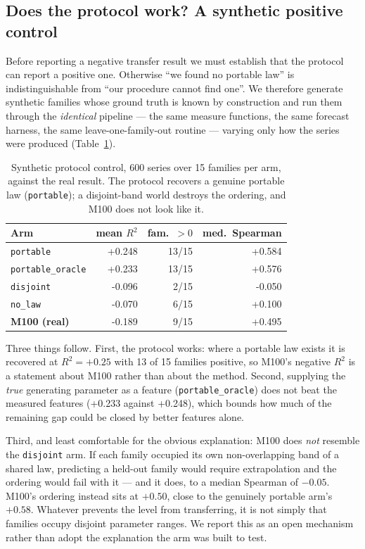 \documentclass[11pt,a4paper]{article}
\newcommand{\num}[1]{#1}
\begin{document}
\subsection{Does the protocol work? A synthetic positive control}
\label{sec:protocol}

Before reporting a negative transfer result we must establish that the protocol
can report a positive one. Otherwise ``we found no portable law'' is
indistinguishable from ``our procedure cannot find one''. We therefore generate
synthetic families whose ground truth is known by construction and run them
through the \emph{identical} pipeline --- the same measure functions, the same
forecast harness, the same leave-one-family-out routine --- varying only how the
series were produced (Table~\ref{tab:protocol}).

\begin{table}[t]
\centering
\caption{Synthetic protocol control, \num{600} series over \num{15} families
per arm, against the real result. The protocol recovers a genuine portable law
(\texttt{portable}); a disjoint-band world destroys the ordering, and M100 does
not look like it.}
\label{tab:protocol}
\small
\begin{tabular}{lrrr}
\toprule
Arm & mean \(R^2\) & fam.\ \(>0\) & med.\ Spearman \\
\midrule
\texttt{portable}     & \num{+0.248} & 13/15 & \num{+0.584} \\
\texttt{portable\_oracle} & \num{+0.233} & 13/15 & \num{+0.576} \\
\texttt{disjoint}     & \num{-0.096} & 2/15  & \num{-0.050} \\
\texttt{no\_law}       & \num{-0.070} & 6/15  & \num{+0.100} \\
\midrule
\textbf{M100 (real)}  & \num{-0.189} & 9/15  & \num{+0.495} \\
\bottomrule
\end{tabular}
\end{table}

Three things follow. First, the protocol works: where a portable law exists it
is recovered at \(R^2 = +0.25\) with \num{13} of \num{15} families positive,
so M100's negative \(R^2\) is a statement about M100 rather than about the
method. Second, supplying the \emph{true} generating parameter as a feature
(\texttt{portable\_oracle}) does not beat the measured features
(\num{+0.233} against \num{+0.248}), which bounds how much of the remaining gap
could be closed by better features alone.

Third, and least comfortable for the obvious explanation: M100 does \emph{not}
resemble the \texttt{disjoint} arm. If each family occupied its own
non-overlapping band of a shared law, predicting a held-out family would require
extrapolation and the ordering would fail with it --- and it does, to a median
Spearman of \(-0.05\). M100's ordering instead sits at \(+0.50\), close to the
genuinely portable arm's \(+0.58\). Whatever prevents the level from
transferring, it is not simply that families occupy disjoint parameter ranges.
We report this as an open mechanism rather than adopt the explanation the arm
was built to test.
\end{document}
